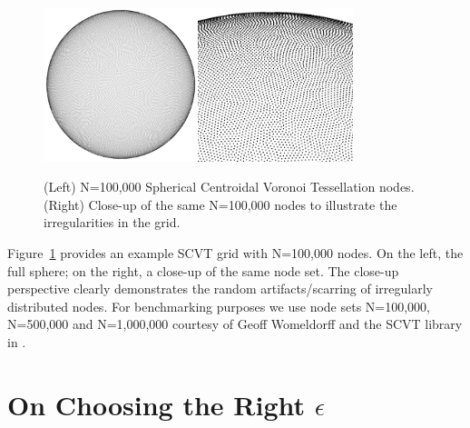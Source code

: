 \documentclass[11pt]{report}
\begin{document}
{\begin{figure} 
\centering
\includegraphics[width=0.4\textwidth]{rbffd_methods_content/grids/N100000_points.png}\includegraphics[width=0.405\textwidth]{rbffd_methods_content/grids/N100000_closeup2.png} 
\caption{(Left) N=100,000 Spherical Centroidal Voronoi Tessellation nodes. (Right) Close-up of the same N=100,000 nodes to illustrate the irregularities in the grid.} 
\label{fig:scvt_nodes}
\end{figure}

Figure~\ref{fig:scvt_nodes} provides an example SCVT grid with N=100,000 nodes. On the left, the full sphere; on the right, a close-up of the same node set. The close-up perspective clearly demonstrates the random artifacts/scarring of irregularly distributed nodes. For benchmarking purposes we use node sets N=100,000, N=500,000 and N=1,000,000 courtesy of Geoff Womeldorff and the SCVT library in \cite{Womeldorff2008}. 

%
%
%

\section{On Choosing the Right $\epsilon$} 
\label{sec:epsilon_contours}

}
\end{document}
